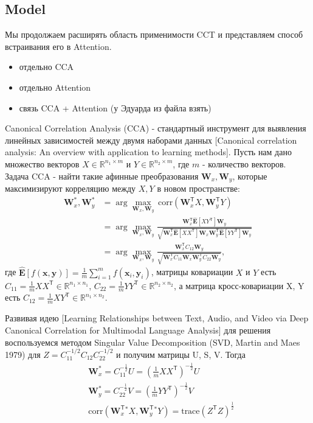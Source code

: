 \documentclass[a4paper,14pt]{article}
\newcommand{\bx}{\mathbf{x}}
\newcommand{\by}{\mathbf{y}}
\newcommand{\bW}{\mathbf{W}}
\newcommand{\bE}{\mathbf{E}}
\newcommand{\dR}{\mathbb{R}}
\newcommand{\T}{^{\mathsf{T}}}
\theoremstyle{plain} %
\theoremstyle{definition} %
\theoremstyle{remark} %
\begin{document}
        \subsection{Model}
        Мы продолжаем расширять область применимости CCT и представляем способ встраивания его в Attention.
        \begin{itemize}
            \item отдельно CCA
            \item отдельно Attention
            \item связь CCA + Attention (у Эдуарда из файла взять)
        \end{itemize}
        Canonical Correlation Analysis (CCA) - стандартный инструмент для выявления линейных зависимостей между двумя наборами данных [Canonical correlation analysis: An overview with application to learning methods]. Пусть нам дано множество векторов $X\in \dR^{n_1\times m}$ и $Y\in \dR^{n_2\times m}$, где $m$ - количество векторов. Задача CCA - найти такие афинные преобразования $\bW_x, \bW_y$, которые максимизируют корреляцию между $X, Y$ в новом пространстве:
        \begin{equation}
            \begin{aligned}
            \bW^{*}_x, \bW^{*}_y &= \arg\max_{\bW_x, \bW_y} \, \text{corr}(\bW_x\T X, \bW_y\T Y) \\
            &= \arg\max_{\bW_x, \bW_y}\frac{\bW_x\T \hat{\bE}[XY\T] \bW_y}{\sqrt{\bW_x\T \hat{\bE}[XX\T] \bW_x \bW_y\T \hat{\bE}[YY\T] \bW_y}} \\
            &= \arg\max_{\bW_x, \bW_y}\frac{\bW_x\T C_{12} \bW_y}{\sqrt{\bW_x\T C_{11} \bW_x \bW_y\T C_{22} \bW_y}},
            \end{aligned}
        \end{equation}
        где $\hat{\bE}[f(\bx, \by)] = \frac{1}{m}\sum\limits_{i=1}^{m}f(\bx_i, \by_i)$, матрицы ковариации $X$ и $Y$ есть $C_{11} = \frac{1}{m}XX\T \in \dR^{n_1\times n_1}$, $C_{22} = \frac{1}{m}YY\T \in \dR^{n_2\times n_2}$, а матрица кросс-ковариации X, Y есть $C_{12} = \frac{1}{m}XY\T \in\dR^{n_1\times n_2}$.

        Развивая идею [Learning Relationships between Text, Audio, and Video via Deep Canonical Correlation for Multimodal Language Analysis] для решения воспользуемся методом Singular Value Decomposition (SVD, Martin and Maes 1979) для $Z = C_{11}^{-1/2}C_{12}C_{22}^{-1/2}$ и получим матрицы U, S, V. Тогда
        \begin{equation}
            \begin{aligned}
                &\bW_x^* = C_{11}^{-\frac{1}{2}}U = (\frac{1}{m}XX\T)^{-\frac{1}{2}}U \\
                &\bW_y^* = C_{22}^{-\frac{1}{2}}V = (\frac{1}{m}YY\T)^{-\frac{1}{2}}V \\
                &\text{corr}(\bW_x\T^* X, \bW_y\T^* Y) = \text{trace}(Z\T Z)^{\frac{1}{2}}
            \end{aligned}
        \end{equation}
\end{document}
